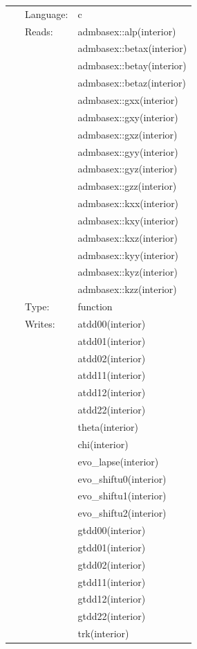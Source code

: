 \documentclass{article}
\begin{document}
 \begin{tabular*}{160mm}{cll} 
~ & Language:  & c \\ 
~ & Reads:  & admbasex::alp(interior) \\ 
~& ~ &admbasex::betax(interior)\\ 
~& ~ &admbasex::betay(interior)\\ 
~& ~ &admbasex::betaz(interior)\\ 
~& ~ &admbasex::gxx(interior)\\ 
~& ~ &admbasex::gxy(interior)\\ 
~& ~ &admbasex::gxz(interior)\\ 
~& ~ &admbasex::gyy(interior)\\ 
~& ~ &admbasex::gyz(interior)\\ 
~& ~ &admbasex::gzz(interior)\\ 
~& ~ &admbasex::kxx(interior)\\ 
~& ~ &admbasex::kxy(interior)\\ 
~& ~ &admbasex::kxz(interior)\\ 
~& ~ &admbasex::kyy(interior)\\ 
~& ~ &admbasex::kyz(interior)\\ 
~& ~ &admbasex::kzz(interior)\\ 
~ & Type:  & function \\ 
~ & Writes:  & atdd00(interior) \\ 
~& ~ &atdd01(interior)\\ 
~& ~ &atdd02(interior)\\ 
~& ~ &atdd11(interior)\\ 
~& ~ &atdd12(interior)\\ 
~& ~ &atdd22(interior)\\ 
~& ~ &theta(interior)\\ 
~& ~ &chi(interior)\\ 
~& ~ &evo\_lapse(interior)\\ 
~& ~ &evo\_shiftu0(interior)\\ 
~& ~ &evo\_shiftu1(interior)\\ 
~& ~ &evo\_shiftu2(interior)\\ 
~& ~ &gtdd00(interior)\\ 
~& ~ &gtdd01(interior)\\ 
~& ~ &gtdd02(interior)\\ 
~& ~ &gtdd11(interior)\\ 
~& ~ &gtdd12(interior)\\ 
~& ~ &gtdd22(interior)\\ 
~& ~ &trk(interior)\\ 
\end{tabular*} 
\end{document}
